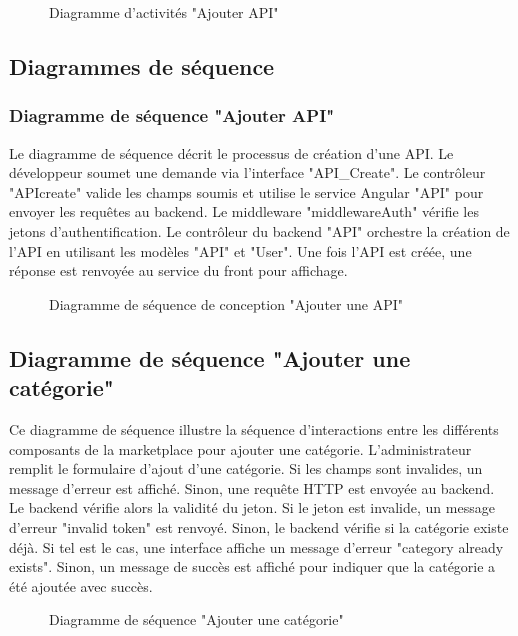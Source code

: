     \begin{figure}[H]
        \centering
        \caption{ Diagramme d'activités "Ajouter API"}
        \label{fig:logo_tt}
    \end{figure}

    \subsection{Diagrammes de séquence}

    \subsubsection{Diagramme de séquence "Ajouter API"}

    Le diagramme de séquence décrit le processus de création d'une API. 
    Le développeur soumet une demande via l'interface "API\_Create". Le contrôleur "APIcreate" valide les champs soumis et utilise le service Angular "API" pour envoyer les requêtes au backend. Le middleware "middlewareAuth" vérifie les jetons d'authentification. Le contrôleur du backend "API" orchestre la création de l'API en utilisant les modèles "API" et "User". Une fois l'API est créée, une réponse est renvoyée au service du front pour affichage.
    
    \begin{figure}[H]
        \centering
        \caption{   Diagramme de séquence de conception "Ajouter une API"
        }
        \label{fig:logo_tt}
    \end{figure}
    \pagebreak

\subsection{Diagramme de séquence "Ajouter une catégorie"}
Ce diagramme de séquence illustre la séquence d'interactions entre les différents composants de la marketplace pour ajouter une catégorie. L'administrateur remplit le formulaire d'ajout d'une catégorie. Si les champs sont invalides, un message d'erreur est affiché. Sinon, une requête HTTP est envoyée au backend. Le backend vérifie alors la validité du jeton. Si le jeton est invalide, un message d'erreur "invalid token" est renvoyé. Sinon, le backend vérifie si la catégorie existe déjà. Si tel est le cas, une interface affiche un message d'erreur "category already exists". Sinon, un message de succès est affiché pour indiquer que la catégorie a été ajoutée avec succès.
\begin{figure}[H]
    \centering
    \caption{ Diagramme de séquence "Ajouter une catégorie" }
    \label{fig:logo_tt}
\end{figure}
 \pagebreak



